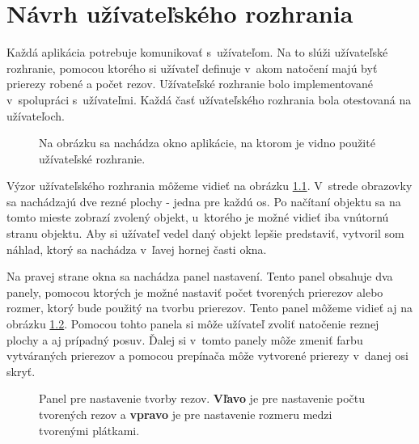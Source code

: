 

\chapter{Návrh užívateľského rozhrania}
Každá aplikácia potrebuje komunikovať s~užívateľom. 
Na to slúži užívateľské rozhranie, pomocou ktorého si užívateľ definuje v~akom natočení majú byť prierezy robené a počet rezov. Užívateľské rozhranie bolo implementované v~spolupráci s~užívateľmi. Každá časť užívateľského rozhrania bola otestovaná na užívateľoch.


\begin{figure}[!h]
\centering
{}
\caption{Na obrázku sa nachádza okno aplikácie, na ktorom je vidno použité užívateľské rozhranie.}
\label{fig:screenshot}
\end{figure}

Výzor užívateľského rozhrania môžeme vidieť na obrázku \ref{fig:screenshot}. V~strede obrazovky sa nachádzajú dve rezné plochy - jedna pre každú os. Po načítaní objektu sa na tomto mieste zobrazí zvolený objekt, u~ktorého je možné vidieť iba vnútornú stranu objektu. Aby si užívateľ vedel daný objekt lepšie predstaviť, vytvoril som náhlad, ktorý sa nachádza v~ľavej hornej časti okna.

Na pravej strane okna sa nachádza panel nastavení. Tento panel obsahuje dva panely, pomocou ktorých je možné nastaviť počet tvorených prierezov alebo rozmer, ktorý bude použitý na tvorbu prierezov. Tento panel môžeme vidieť aj na obrázku \ref{fig:Xaxis}.  Pomocou tohto panela si môže užívateľ zvoliť natočenie reznej plochy a aj prípadný posuv. Ďalej si v~tomto panely môže zmeniť farbu vytváraných prierezov a pomocou prepínača môže vytvorené prierezy v~danej osi skryť.

\begin{figure}[!h]
\centering
{}\quad
{}
\caption{Panel pre nastavenie tvorby rezov. \textbf{Vľavo} je pre nastavenie počtu tvorených rezov a \textbf{vpravo} je pre nastavenie rozmeru medzi tvorenými plátkami.}
\label{fig:Xaxis}
\end{figure}


